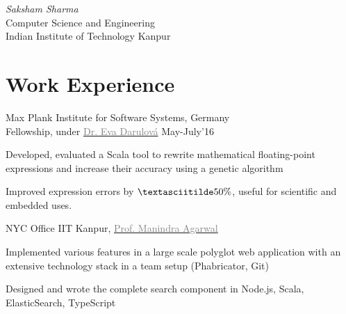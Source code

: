 \documentclass{tccv}
\begin{document}
{ \textit{Saksham \textcolor{myred}{Sharma}}}
\medskip\\
\large{Computer Science and Engineering}\\
{Indian Institute of Technology Kanpur}

\vspace{-0.5cm}
\section{Work Experience}
\begin{experience}

  {Max Plank Institute for Software Systems, \small{Germany}\\
  Fellowship, under
  \href{http://www.mpi-sws.org/~eva}{\textcolor{gray}{Dr. Eva
      Darulová}}
  \hfill May-July'16}
  {
  \item Developed, evaluated a Scala tool to rewrite
    mathematical floating-point expressions and increase their
    accuracy using a genetic algorithm
  \item Improved expression errors by
    $\textasciitilde50\%$, useful for scientific and embedded uses.
  }

  {NYC Office IIT Kanpur,
    \href{http://cse.iitk.ac.in/~manindra}{\textcolor{gray}{Prof. Manindra Agarwal}}}
  {
  \item Implemented various features in a large scale polyglot web
    application with an extensive technology stack in a team setup
    (Phabricator, Git)
  \item Designed and wrote the complete search component in Node.js, Scala, ElasticSearch, TypeScript
  }
\end{experience}

\vspace{-0.6cm}
\end{document}
